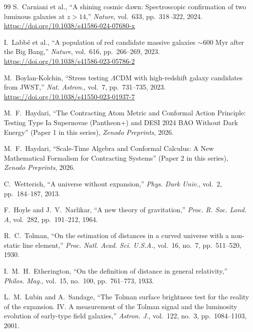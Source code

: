 \documentclass[11pt,a4paper]{article}
\begin{document}
\begin{thebibliography}{99}
    S.~Carniani et al., ``A shining cosmic dawn: Spectroscopic confirmation of two luminous galaxies at $z > 14$,'' \textit{Nature}, vol.~633, pp.~318--322, 2024. \url{https://doi.org/10.1038/s41586-024-07680-x}

    I.~Labb\'e et al., ``A population of red candidate massive galaxies $\sim 600\text{ Myr}$ after the Big Bang,'' \textit{Nature}, vol.~616, pp.~266--269, 2023. \url{https://doi.org/10.1038/s41586-023-05786-2}

    M.~Boylan-Kolchin, ``Stress testing $\Lambda$CDM with high-redshift galaxy candidates from JWST,'' \textit{Nat. Astron.}, vol.~7, pp.~731--735, 2023. \url{https://doi.org/10.1038/s41550-023-01937-7}

    M.~F.~Haydari, ``The Contracting Atom Metric and Conformal Action Principle: Testing Type Ia Supernovae (Pantheon+) and DESI 2024 BAO Without Dark Energy'' (Paper 1 in this series), \textit{Zenodo Preprints}, 2026.

    M.~F.~Haydari, ``Scale-Time Algebra and Conformal Calculus: A New Mathematical Formalism for Contracting Systems'' (Paper 2 in this series), \textit{Zenodo Preprints}, 2026.

    C.~Wetterich, ``A universe without expansion,'' \textit{Phys. Dark Univ.}, vol.~2, pp.~184--187, 2013.

    F.~Hoyle and J.~V.~Narlikar, ``A new theory of gravitation,'' \textit{Proc. R. Soc. Lond. A}, vol.~282, pp.~191--212, 1964.

    R.~C.~Tolman, ``On the estimation of distances in a curved universe with a non-static line element,'' \textit{Proc. Natl. Acad. Sci. U.S.A.}, vol.~16, no.~7, pp.~511--520, 1930.

    I.~M.~H.~Etherington, ``On the definition of distance in general relativity,'' \textit{Philos. Mag.}, vol.~15, no.~100, pp.~761--773, 1933.

    L.~M.~Lubin and A.~Sandage, ``The Tolman surface brightness test for the reality of the expansion. IV. A measurement of the Tolman signal and the luminosity evolution of early-type field galaxies,'' \textit{Astron. J.}, vol.~122, no.~3, pp.~1084--1103, 2001.
\end{thebibliography}
\end{document}
